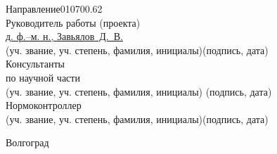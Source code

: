 \begin{titlepage}
\begin{flushleft}
		Направление\hspace{1cm}010700.62\\
		Руководитель работы (проекта)\\
		\underline{д. ф.--м. н., Завьялов~Д.~В.}\hfill\underline{\hspace{5cm}}\\
		\vspace{-.2cm}\hspace{.4cm}\footnotesize(уч. звание, уч. степень, 
			фамилия, инициалы)\hspace{6.5cm}(подпись, дата)\normalsize\\
		Консультанты\\
		по научной части \underline{\hspace{7cm}}\hfill%
			\underline{\hspace{5cm}}\\\vspace{-.2cm}\hspace{4cm}%
			\footnotesize(уч. звание, уч. степень, фамилия, инициалы)%
			\hspace{3cm}(подпись, дата)\normalsize\\
		Нормоконтроллер \underline{\hspace{7cm}}
			\hfill\underline{\hspace{5cm}}\\
		\vspace{-.2cm}\hspace{4cm}\footnotesize(уч. звание, уч. степень, 
			фамилия, инициалы)\hspace{3cm}(подпись, дата)\normalsize\\
	\end{flushleft}

	\vspace{\fill}

	\begin{center}
		Волгоград \the\year
	\end{center}
\end{titlepage}

